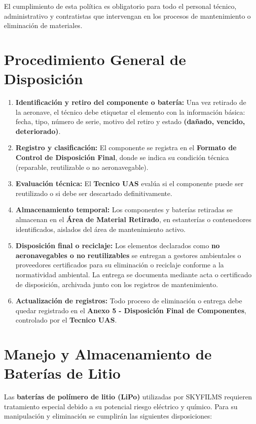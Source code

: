 El cumplimiento de esta política es obligatorio para todo el personal técnico, administrativo y contratistas que intervengan en los procesos de mantenimiento o eliminación de materiales.

\section{Procedimiento General de Disposición}

\begin{enumerate}
    \item \textbf{Identificación y retiro del componente o batería:} Una vez retirado de la aeronave, el técnico debe etiquetar el elemento con la información básica: fecha, tipo, número de serie, motivo del retiro y estado \textbf{(dañado, vencido, deteriorado)}.

    \item \textbf{Registro y clasificación:} El componente se registra en el \textbf{Formato de Control de Disposición Final}, donde se indica su condición técnica (reparable, reutilizable o no aeronavegable).

    \item \textbf{Evaluación técnica:} El \textbf{Tecnico UAS} evalúa si el componente puede ser reutilizado o si debe ser descartado definitivamente.

    \item \textbf{Almacenamiento temporal:} Los componentes y baterías retiradas se almacenan en el \textbf{Área de Material Retirado}, en estanterías o contenedores identificados, aislados del área de mantenimiento activo.

    \item \textbf{Disposición final o reciclaje:} Los elementos declarados como \textbf{no aeronavegables o no reutilizables} se entregan a gestores ambientales o proveedores certificados para su eliminación o reciclaje conforme a la normatividad ambiental. La entrega se documenta mediante acta o certificado de disposición, archivada junto con los registros de mantenimiento.

    \item \textbf{Actualización de registros:} Todo proceso de eliminación o entrega debe quedar registrado en el \textbf{Anexo 5 - Disposición Final de Componentes}, controlado por el \textbf{Tecnico UAS}.
\end{enumerate}

\section{Manejo y Almacenamiento de Baterías de Litio}
Las \textbf{baterías de polímero de litio (LiPo)} utilizadas por SKYFILMS requieren tratamiento especial debido a su potencial riesgo eléctrico y químico. Para su manipulación y eliminación se cumplirán las siguientes disposiciones:


